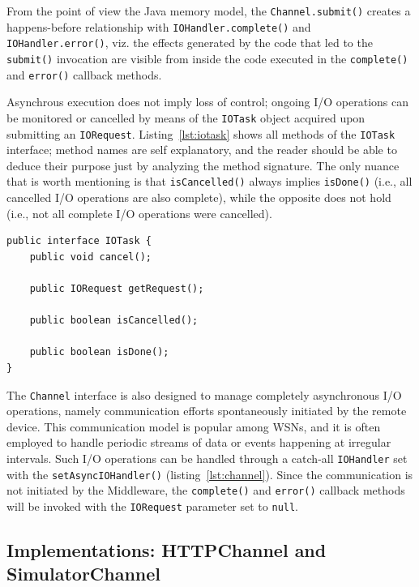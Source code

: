From the point of view the Java memory model, the \texttt{Channel.submit()} creates a happens-before relationship with \texttt{IOHandler.complete()} and \texttt{IOHandler.error()}, viz. the effects generated by the code that led to the \texttt{submit()} invocation are visible from inside the code executed in the \texttt{complete()} and \texttt{error()} callback methods.

Asynchrous execution does not imply loss of control; ongoing I/O operations can be monitored or cancelled by means of the \texttt{IOTask} object acquired upon submitting an \texttt{IORequest}. Listing~\ref{lst:iotask} shows all methods of the \texttt{IOTask} interface; method names are self explanatory, and the reader should be able to deduce their purpose just by analyzing the method signature. The only nuance that is worth mentioning is that \texttt{isCancelled()} always implies \texttt{isDone()} (i.e., all cancelled I/O operations are also complete), while the opposite does not hold (i.e., not all complete I/O operations were cancelled).

\lstset{language=Java}
\begin{lstlisting}[float,floatplacement=!hbt,caption=The IOTask interface,label={lst:iotask}]
public interface IOTask {
	public void cancel();
	
	public IORequest getRequest();
	
	public boolean isCancelled();
	
	public boolean isDone();
}
\end{lstlisting}

The \texttt{Channel} interface is also designed to manage completely asynchronous I/O operations, namely communication efforts spontaneously initiated by the remote device. This communication model is popular among WSNs, and it is often employed to handle periodic streams of data or events happening at irregular intervals. Such I/O operations can be handled through a catch-all \texttt{IOHandler} set with the \texttt{setAsyncIOHandler()} (listing~\ref{lst:channel}). Since the communication is not initiated by the Middleware, the \texttt{complete()} and \texttt{error()} callback methods will be invoked with the \texttt{IORequest} parameter set to \texttt{null}.


\subsection{Implementations: HTTPChannel and SimulatorChannel}
\label{sec:channel.implementations}

